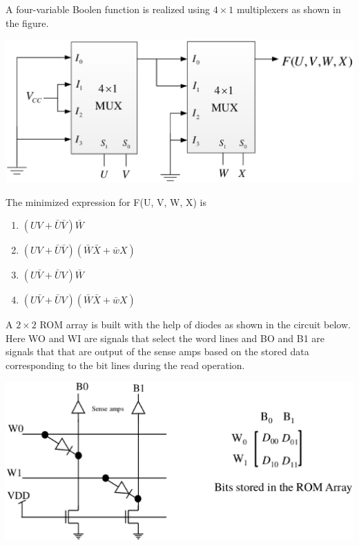 \item A four-variable Boolen function is realized using $4 \times 1$ multiplexers as shown in the figure.

\includegraphics[scale=0.22]{41}

The minimized expression for F(U, V, W, X) is
\begin{enumerate}
\item $(UV + \bar{U}\bar{V})\bar{W}$
\item $(UV + \bar{U}\bar{V})(\bar{W}\bar{X} + \bar{w}X)$
\item $(U\bar{V} + \bar{U}V)\bar{W}$
\item $(U\bar{V} + \bar{U}V)(\bar{W}\bar{X} + \bar{w}X)$
\end{enumerate}

\item A $2 \times 2$ ROM array is built with the help of diodes as shown in the circuit below. Here WO and WI are signals that select the word lines and BO and B1 are signals that that are output of the sense amps based on the stored data corresponding to the bit lines during the read operation.

\includegraphics[scale=0.22]{42}

